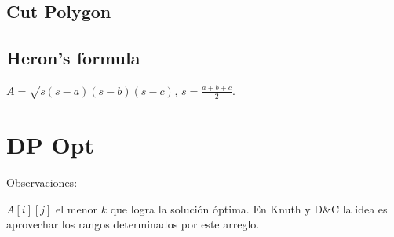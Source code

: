 \subsection{Cut Polygon}
%

\subsection{Heron's formula}
{
\( {\displaystyle A={\sqrt {s(s-a)(s-b)(s-c)}}} \),
\( {\displaystyle s={\frac {a+b+c}{2}}} \).
}

\section{DP Opt}
Observaciones:

$A[i][j]$ el menor $k$ que logra la solución óptima. En Knuth y D\&C la idea es aprovechar los rangos
determinados por este arreglo.

